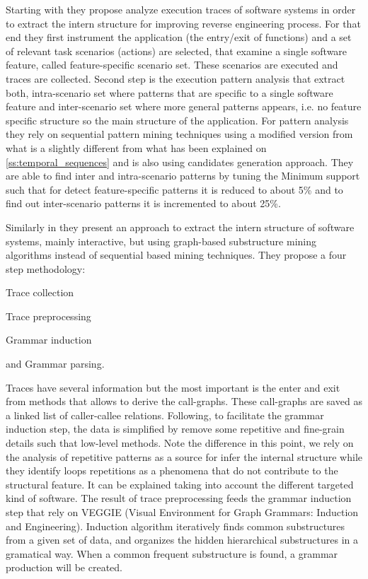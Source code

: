 Starting with \cite{Safyallah2006} they propose analyze execution
traces of software systems in order to extract the intern structure for
improving reverse engineering process. For
that end they first instrument the application (the entry/exit of functions) and 
a set of relevant task scenarios (actions) are selected, that examine a 
single software feature, called feature-specific scenario set. These scenarios
are executed and traces are collected. Second step is the execution pattern
analysis that extract both, intra-scenario set where patterns that are specific
to a single software feature and inter-scenario set where more general
patterns appears, i.e. no feature specific structure so the main structure of 
the application. For pattern analysis they rely on sequential pattern mining
techniques using a modified version from \cite{Agrawal_seqpatt} what is a
slightly different from what has been explained on \ref{ss:temporal_sequences} 
and is also using candidates generation approach. They are able to find inter
and intra-scenario patterns by tuning the Minimum support such that for detect
feature-specific patterns it is reduced to about 5\% and to find out
inter-scenario patterns it is incremented to about 25\%.

Similarly in \cite{Zhao2008} they present an approach to extract the intern
structure of software systems, mainly interactive, but using graph-based 
substructure mining algorithms instead of sequential based mining techniques.
They propose a four step methodology: 
\begin{enumerate*}[label=\roman*)]
  \item Trace collection
  \item Trace preprocessing
  \item Grammar induction
  \item and Grammar parsing.
\end{enumerate*}
Traces have several information but the most important is the enter and exit
from methods that allows to derive the call-graphs. These call-graphs are saved
as a linked list of caller-callee relations. Following, to facilitate the
grammar induction step, the data is simplified by remove some repetitive and
fine-grain details such that low-level methods. Note
the difference in this point, we rely on the analysis of repetitive patterns as
a source for infer the internal structure while they identify loops repetitions
as a phenomena that do not contribute to the structural feature. It can be
explained taking into account the different targeted kind of software. The
result of trace preprocessing feeds the grammar induction step that rely on
VEGGIE (Visual Environment for Graph Grammars: Induction and Engineering). 
Induction algorithm iteratively finds common substructures from a
given set of data, and organizes the hidden hierarchical substructures in a
gramatical way. When a common frequent substructure is found, a grammar
production will be created.

